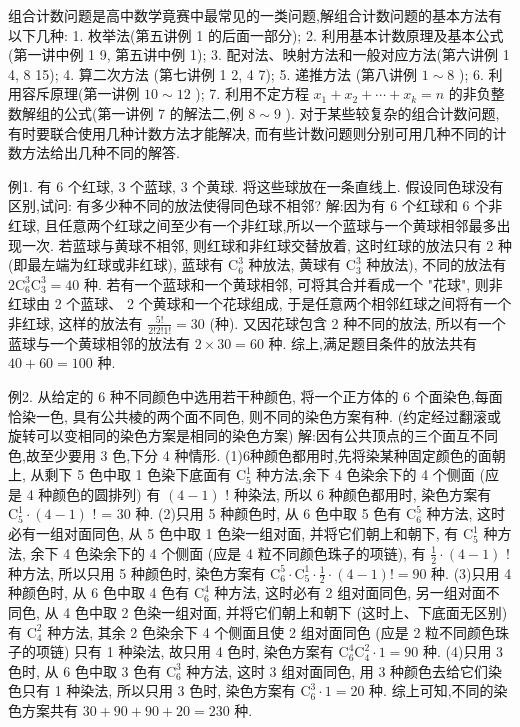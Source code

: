 
组合计数问题是高中数学竟赛中最常见的一类问题,解组合计数问题的基本方法有以下几种:
1. 枚举法(第五讲例 1 的后面一部分);
2. 利用基本计数原理及基本公式(第一讲中例 1 9, 第五讲中例 1);
3. 配对法、映射方法和一般对应方法(第六讲例 1 4, 8 15);
4. 算二次方法 (第七讲例 1 2, 4 7);
5. 递推方法 (第八讲例 $1 \sim 8$ );
6. 利用容斥原理(第一讲例 $10 \sim 12$ );
7. 利用不定方程 $x_1+x_2+\cdots+x_k=n$ 的非负整数解组的公式(第一讲例 7 的解法二,例 $8 \sim 9$ ).
对于某些较复杂的组合计数问题, 有时要联合使用几种计数方法才能解决, 而有些计数问题则分别可用几种不同的计数方法给出几种不同的解答.



例1. 有 6 个红球, 3 个蓝球, 3 个黄球.
将这些球放在一条直线上.
假设同色球没有区别,试问: 有多少种不同的放法使得同色球不相邻?
解:因为有 6 个红球和 6 个非红球, 且任意两个红球之间至少有一个非红球,所以一个蓝球与一个黄球相邻最多出现一次.
若蓝球与黄球不相邻, 则红球和非红球交替放着, 这时红球的放法只有 2 种 (即最左端为红球或非红球), 蓝球有 $\mathrm{C}_6^3$ 种放法, 黄球有 $\mathrm{C}_3^3$ 种放法), 不同的放法有 $2 \mathrm{C}_6^3 \mathrm{C}_3^3=40$ 种.
若有一个蓝球和一个黄球相邻, 可将其合并看成一个 "花球", 则非红球由 2 个蓝球、 2 个黄球和一个花球组成, 于是任意两个相邻红球之间将有一个非红球, 这样的放法有 $\frac{5 !}{2 ! 2 ! 1 !}=30$ (种). 又因花球包含 2 种不同的放法, 所以有一个蓝球与一个黄球相邻的放法有 $2 \times 30=60$ 种.
综上,满足题目条件的放法共有 $40+60=100$ 种.



例2. 从给定的 6 种不同颜色中选用若干种颜色, 将一个正方体的 6 个面染色,每面恰染一色, 具有公共棱的两个面不同色, 则不同的染色方案有种.
(约定经过翻滚或旋转可以变相同的染色方案是相同的染色方案) 
解:因有公共顶点的三个面互不同色,故至少要用 3 色,下分 4 种情形.
(1)6种颜色都用时,先将染某种固定颜色的面朝上, 从剩下 5 色中取 1 色染下底面有 $\mathrm{C}_5^1$ 种方法,余下 4 色染余下的 4 个侧面 (应是 4 种颜色的圆排列) 有 $(4-1)$ ! 种染法, 所以 6 种颜色都用时, 染色方案有 $\mathrm{C}_5^1 \cdot(4-1)$ ! = 30 种.
(2)只用 5 种颜色时, 从 6 色中取 5 色有 $\mathrm{C}_6^5$ 种方法, 这时必有一组对面同色, 从 5 色中取 1 色染一组对面, 并将它们朝上和朝下, 有 $\mathrm{C}_5^1$ 种方法, 余下 4 色染余下的 4 个侧面 (应是 4 粒不同颜色珠子的项链), 有 $\frac{1}{2} \cdot(4-1)$ ! 种方法, 所以只用 5 种颜色时, 染色方案有 $\mathrm{C}_6^5 \cdot \mathrm{C}_5^1 \cdot \frac{1}{2} \cdot(4-1) !=90$ 种.
(3)只用 4 种颜色时, 从 6 色中取 4 色有 $\mathrm{C}_6^4$ 种方法, 这时必有 2 组对面同色, 另一组对面不同色, 从 4 色中取 2 色染一组对面, 并将它们朝上和朝下 (这时上、下底面无区别)有 $\mathrm{C}_4^2$ 种方法, 其余 2 色染余下 4 个侧面且使 2 组对面同色 (应是 2 粒不同颜色珠子的项链) 只有 1 种染法, 故只用 4 色时, 染色方案有 $\mathrm{C}_6^4 \mathrm{C}_4^2 \cdot 1=90$ 种.
(4)只用 3 色时, 从 6 色中取 3 色有 $\mathrm{C}_6^3$ 种方法, 这时 3 组对面同色, 用 3 种颜色去给它们染色只有 1 种染法, 所以只用 3 色时, 染色方案有 $\mathrm{C}_6^3 \cdot 1=20$ 种.
综上可知,不同的染色方案共有 $30+90+90+20=230$ 种.



